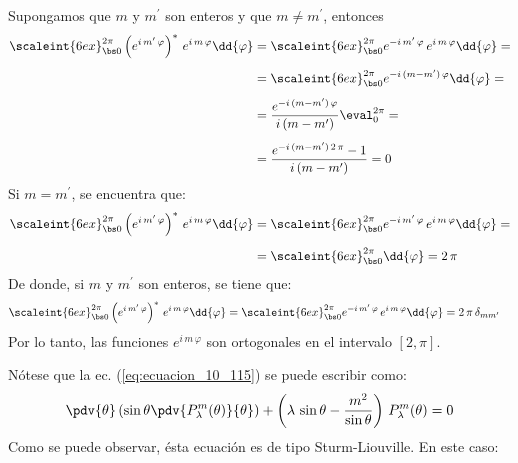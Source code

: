 Supongamos que $m$ y $m^{\prime}$ son enteros y que $m \neq m^{\prime}$, entonces
\begin{align}
\begin{aligned}[b]
\scaleint{6ex}_{\bs 0}^{2 \pi} \left( e^{i \, m^{\prime} \, \varphi} \right)^{*} \, e^{i \, m \, \varphi} \dd{\varphi} &= \scaleint{6ex}_{\bs 0}^{2 \pi} e^{-i \, m^{\prime} \, \varphi} \, e^{i \, m \, \varphi} \dd{\varphi} = \\[0.5em]
&= \scaleint{6ex}_{\bs 0}^{2 \pi} e^{-i \, (m - m^{\prime} )\, \varphi} \dd{\varphi} = \\[0.5em]
&= \dfrac{e^{-i \, (m - m^{\prime} )\, \varphi}}{i \, (m - m^{\prime})} \eval_{0}^{2 \pi} = \\[0.5em]
&= \dfrac{e^{-i \, (m - m^{\prime} )\, 2 \, \pi} - 1}{i \, (m - m^{\prime})} = 0 
\end{aligned}
\label{eq:ecuacion_10_119}
\end{align}
Si $m = m^{\prime}$, se encuentra que:
\begin{align}
\begin{aligned}[b]
\scaleint{6ex}_{\bs 0}^{2 \pi} \left( e^{i \, m^{\prime} \, \varphi} \right)^{*} \, e^{i \, m \, \varphi} \dd{\varphi} &= \scaleint{6ex}_{\bs 0}^{2 \pi} e^{-i \, m^{\prime} \, \varphi} \, e^{i \, m \, \varphi} \dd{\varphi} = \\[0.5em]
&= \scaleint{6ex}_{\bs 0}^{2 \pi} \dd{\varphi} = 2 \, \pi
\end{aligned}
\label{eq:ecuacion_10_120}
\end{align}
De donde, si $m$ y $m^{\prime}$ son enteros, se tiene que:
\begin{align}
\scaleint{6ex}_{\bs 0}^{2 \pi} \left( e^{i \, m^{\prime} \, \varphi} \right)^{*} \, e^{i \, m \, \varphi} \dd{\varphi} &= \scaleint{6ex}_{\bs 0}^{2 \pi} e^{-i \, m^{\prime} \, \varphi} \, e^{i \, m \, \varphi} \dd{\varphi} = 2 \, \pi \, \delta_{m m^{\prime}}
\label{eq:ecuacion_10_121}
\end{align}
Por lo tanto, las funciones $e^{i \, m \, \varphi}$ son ortogonales en el intervalo $[2, \pi]$.
\par
Nótese que la ec. (\ref{eq:ecuacion_10_115}) se puede escribir como:
\begin{align}
\pdv{\theta} \left( \sin \theta \pdv{P_{\lambda}^{m} (\theta)}{\theta} \right) + \left(\lambda \, \sin \theta - \dfrac{m^{2}}{\sin \theta} \right) \, P_{\lambda}^{m} (\theta) = 0
\label{eq:ecuacion_10_122}
\end{align}
Como se puede observar, ésta ecuación es de tipo Sturm-Liouville. En este caso:
